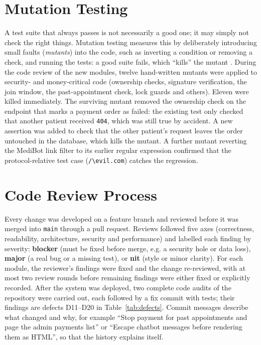 \FloatBarrier
\section{Mutation Testing}
\label{sec:mutation}

A test suite that always passes is not necessarily a good one; it may simply not check the right things. Mutation testing measures this by deliberately introducing small faults (\emph{mutants}) into the code, such as inverting a condition or removing a check, and running the tests: a good suite fails, which ``kills'' the mutant \cite{jia2011}. During the code review of the new modules, twelve hand-written mutants were applied to security- and money-critical code (ownership checks, signature verification, the join window, the past-appointment check, lock guards and others). Eleven were killed immediately. The surviving mutant removed the ownership check on the endpoint that marks a payment order as failed: the existing test only checked that another patient received \texttt{404}, which was still true by accident. A new assertion was added to check that the other patient's request leaves the order untouched in the database, which kills the mutant. A further mutant reverting the MediBot link filter to its earlier regular expression confirmed that the protocol-relative test case (\texttt{/\textbackslash evil.com}) catches the regression.

\FloatBarrier
\section{Code Review Process}

Every change was developed on a feature branch and reviewed before it was merged into \texttt{main} through a pull request. Reviews followed five axes (correctness, readability, architecture, security and performance) and labelled each finding by severity: \textbf{blocker} (must be fixed before merge, e.g. a security hole or data loss), \textbf{major} (a real bug or a missing test), or \textbf{nit} (style or minor clarity). For each module, the reviewer's findings were fixed and the change re-reviewed, with at most two review rounds before remaining findings were either fixed or explicitly recorded. After the system was deployed, two complete code audits of the repository were carried out, each followed by a fix commit with tests; their findings are defects D11--D20 in Table~\ref{tab:defects}. Commit messages describe what changed and why, for example ``Stop payment for past appointments and page the admin payments list'' or ``Escape chatbot messages before rendering them as HTML'', so that the history explains itself.

